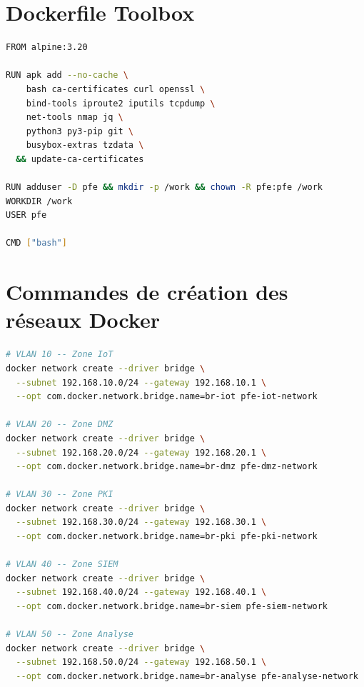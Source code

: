\section{Dockerfile Toolbox}
\label{sec:config_dockerfile_toolbox}

\begin{lstlisting}[language=bash, caption={Dockerfile --- Image toolbox pour tests réseau et sécurité}, label={lst:dockerfile_toolbox}]
FROM alpine:3.20

RUN apk add --no-cache \
    bash ca-certificates curl openssl \
    bind-tools iproute2 iputils tcpdump \
    net-tools nmap jq \
    python3 py3-pip git \
    busybox-extras tzdata \
  && update-ca-certificates

RUN adduser -D pfe && mkdir -p /work && chown -R pfe:pfe /work
WORKDIR /work
USER pfe

CMD ["bash"]
\end{lstlisting}

\section{Commandes de création des réseaux Docker}
\label{sec:config_docker_networks}

\begin{lstlisting}[language=bash, caption={Création des réseaux Docker par zone de sécurité}, label={lst:docker_networks}]
# VLAN 10 -- Zone IoT
docker network create --driver bridge \
  --subnet 192.168.10.0/24 --gateway 192.168.10.1 \
  --opt com.docker.network.bridge.name=br-iot pfe-iot-network

# VLAN 20 -- Zone DMZ
docker network create --driver bridge \
  --subnet 192.168.20.0/24 --gateway 192.168.20.1 \
  --opt com.docker.network.bridge.name=br-dmz pfe-dmz-network

# VLAN 30 -- Zone PKI
docker network create --driver bridge \
  --subnet 192.168.30.0/24 --gateway 192.168.30.1 \
  --opt com.docker.network.bridge.name=br-pki pfe-pki-network

# VLAN 40 -- Zone SIEM
docker network create --driver bridge \
  --subnet 192.168.40.0/24 --gateway 192.168.40.1 \
  --opt com.docker.network.bridge.name=br-siem pfe-siem-network

# VLAN 50 -- Zone Analyse
docker network create --driver bridge \
  --subnet 192.168.50.0/24 --gateway 192.168.50.1 \
  --opt com.docker.network.bridge.name=br-analyse pfe-analyse-network
\end{lstlisting}


